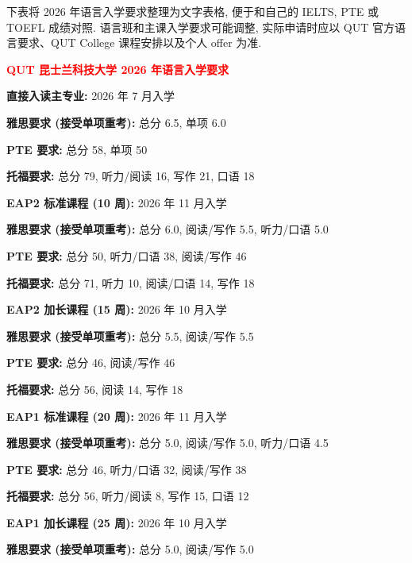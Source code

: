 \documentclass[UTF8,a4paper,12pt]{ctexart}
\begin{document}
下表将 2026 年语言入学要求整理为文字表格, 便于和自己的 IELTS, PTE 或 TOEFL 成绩对照. 语言班和主课入学要求可能调整, 实际申请时应以 QUT 官方语言要求、QUT College 课程安排以及个人 offer 为准.

\begin{center}
\textbf{\textcolor{red}{QUT 昆士兰科技大学 2026 年语言入学要求}}
\end{center}

\begingroup
\small
\setlength{\parindent}{0pt}
\setlength{\parskip}{0.58em}

\textbf{直接入读主专业: }2026 年 7 月入学

\textbf{雅思要求 (接受单项重考): }总分 6.5, 单项 6.0

\textbf{PTE 要求: }总分 58, 单项 50

\textbf{托福要求: }总分 79, 听力/阅读 16, 写作 21, 口语 18

\vspace{0.75em}

\textbf{EAP2 标准课程 (10 周): }2026 年 11 月入学

\textbf{雅思要求 (接受单项重考): }总分 6.0, 阅读/写作 5.5, 听力/口语 5.0

\textbf{PTE 要求: }总分 50, 听力/口语 38, 阅读/写作 46

\textbf{托福要求: }总分 71, 听力 10, 阅读/口语 14, 写作 18

\vspace{0.75em}

\textbf{EAP2 加长课程 (15 周): }2026 年 10 月入学

\textbf{雅思要求 (接受单项重考): }总分 5.5, 阅读/写作 5.5

\textbf{PTE 要求: }总分 46, 阅读/写作 46

\textbf{托福要求: }总分 56, 阅读 14, 写作 18

\vspace{0.75em}

\textbf{EAP1 标准课程 (20 周): }2026 年 11 月入学

\textbf{雅思要求 (接受单项重考): }总分 5.0, 阅读/写作 5.0, 听力/口语 4.5

\textbf{PTE 要求: }总分 46, 听力/口语 32, 阅读/写作 38

\textbf{托福要求: }总分 56, 听力/阅读 8, 写作 15, 口语 12

\vspace{0.75em}

\textbf{EAP1 加长课程 (25 周): }2026 年 10 月入学

\textbf{雅思要求 (接受单项重考): }总分 5.0, 阅读/写作 5.0
\end{document}
